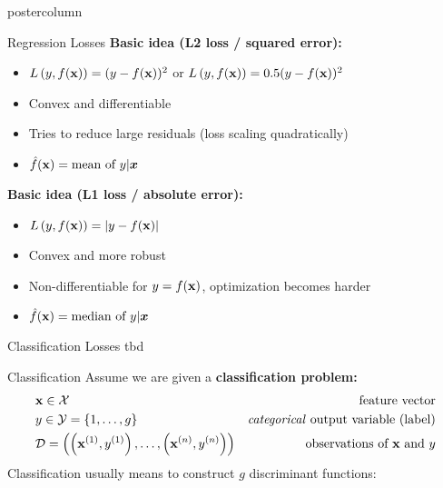 \documentclass{beamer}
\begin{document}
\begin{frame}[fragile]{}
\begin{columns}
\begin{column}{.31\textwidth}
\begin{beamercolorbox}[center]{postercolumn}
\begin{minipage}{.98\textwidth}
{%
\begin{myblock}{Regression Losses}
  \textbf{Basic idea (L2 loss / squared error):} 
\begin{itemize}    
  \setlength{\itemindent}{+.3in}
  \item $L\left(y, f(\mathbf{x})\right) = (y-f(\mathbf{x}))^2$ or $L\left(y, f(\mathbf{x})\right) = 0.5 (y-f(\mathbf{x}))^2$
  \item Convex and differentiable
  \item Tries to reduce large residuals (loss scaling quadratically)
  \item $\hat{f}(\mathbf{x}) = \text{mean of } y | \bm{x}$
\end{itemize}

\vspace*{1ex}


  \textbf{Basic idea (L1 loss / absolute error):} 
\begin{itemize}
\setlength{\itemindent}{+.3in}
  \item $L\left(y, f(\mathbf{x})\right) = |y-f(\mathbf{x})|$
  \item Convex and more robust
  \item Non-differentiable for $y = f(\mathbf{x})$, optimization becomes harder
  \item $\hat{f}(\mathbf{x}) = \text{median of } y | \bm{x}$     
\end{itemize}
\end{myblock}

\begin{myblock}{Classification Losses}
  tbd
\end{myblock}

\begin{myblock}{Classification}
%             
Assume we are given a \textbf{classification problem:}
\begin{eqnarray*} & \mathbf{x} \in \mathcal{X} \quad & \text{feature vector}\\ & y \in \mathcal{Y} = \{1, \ldots, g\} \quad & \text{\emph{categorical} output variable (label)}\\ &\mathcal{D} = \left( \left(\mathbf{x}^{(1)}, y^{(1)}\right), \ldots, \left(\mathbf{x}^{(n)}, y^{(n)}\right)\right) & \text{observations of $\mathbf{x}$ and $y$} \end{eqnarray*}
\vspace*{1ex}
Classification usually means to construct $g$ discriminant functions:
  

\end{myblock}}
\end{minipage}
\end{beamercolorbox}
\end{column}
\end{columns}
\end{frame}
\end{document}
